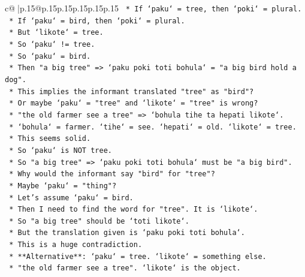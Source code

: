 \documentclass{article}
\begin{document}
{\begin{supertabular}{c@{$\;$}|p{.15\linewidth}@{}p{.15\linewidth}p{.15\linewidth}p{.15\linewidth}p{.15\linewidth}p{.15\linewidth}}
{{{\texttt{                        *   If `paku` = tree, then `poki` = plural.} \\
\texttt{                        *   If `paku` = bird, then `poki` = plural.} \\
\texttt{                        *   But `likote` = tree.} \\
\texttt{                        *   So `paku` != tree.} \\
\texttt{                        *   So `paku` = bird.} \\
\texttt{                        *   Then "a big tree" => `paku poki toti bohula` = "a big bird hold a dog".} \\
\texttt{                        *   This implies the informant translated "tree" as "bird"?} \\
\texttt{                        *   Or maybe `paku` = "tree" and `likote` = "tree" is wrong?} \\
\texttt{                        *   "the old farmer see a tree" => `bohula tihe ta hepati likote`.} \\
\texttt{                        *   `bohula` = farmer. `tihe` = see. `hepati` = old. `likote` = tree.} \\
\texttt{                        *   This seems solid.} \\
\texttt{                        *   So `paku` is NOT tree.} \\
\texttt{                        *   So "a big tree" => `paku poki toti bohula` must be "a big bird".} \\
\texttt{                        *   Why would the informant say "bird" for "tree"?} \\
\texttt{                        *   Maybe `paku` = "thing"?} \\
\texttt{                        *   Let's assume `paku` = bird.} \\
\texttt{                        *   Then I need to find the word for "tree". It is `likote`.} \\
\texttt{                        *   So "a big tree" should be `toti likote`.} \\
\texttt{                        *   But the translation given is `paku poki toti bohula`.} \\
\texttt{                        *   This is a huge contradiction.} \\
\texttt{                        *   **Alternative**: `paku` = tree. `likote` = something else.} \\
\texttt{                        *   "the old farmer see a tree". `likote` is the object.} \\
}}}
\end{supertabular}}
\end{document}

